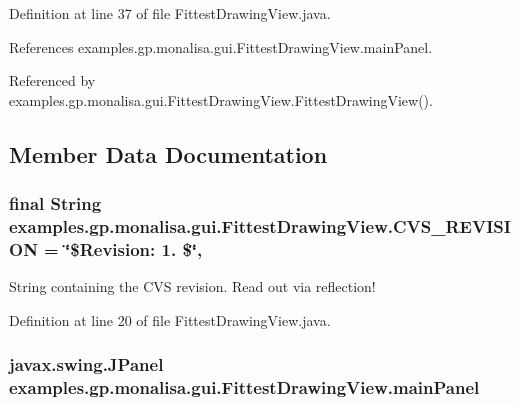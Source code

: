 Definition at line 37 of file Fittest\-Drawing\-View.\-java.



References examples.\-gp.\-monalisa.\-gui.\-Fittest\-Drawing\-View.\-main\-Panel.



Referenced by examples.\-gp.\-monalisa.\-gui.\-Fittest\-Drawing\-View.\-Fittest\-Drawing\-View().



\subsection{Member Data Documentation}
\hypertarget{classexamples_1_1gp_1_1monalisa_1_1gui_1_1_fittest_drawing_view_ae6055da6aad5d8de8cb42272378f9f05}{
\subsubsection[{C\-V\-S\-\_\-\-R\-E\-V\-I\-S\-I\-O\-N}]{\setlength{\rightskip}{0pt plus 5cm}final String examples.\-gp.\-monalisa.\-gui.\-Fittest\-Drawing\-View.\-C\-V\-S\-\_\-\-R\-E\-V\-I\-S\-I\-O\-N = \char`\"{}\$Revision\-: 1. \$\char`\"{}\hspace{0.3cm}{\ttfamily [static]}, {\ttfamily [private]}}}\label{classexamples_1_1gp_1_1monalisa_1_1gui_1_1_fittest_drawing_view_ae6055da6aad5d8de8cb42272378f9f05}
String containing the C\-V\-S revision. Read out via reflection! 

Definition at line 20 of file Fittest\-Drawing\-View.\-java.

\hypertarget{classexamples_1_1gp_1_1monalisa_1_1gui_1_1_fittest_drawing_view_a466838532b223edc69311e8193788c7a}{
\subsubsection[{main\-Panel}]{\setlength{\rightskip}{0pt plus 5cm}javax.\-swing.\-J\-Panel examples.\-gp.\-monalisa.\-gui.\-Fittest\-Drawing\-View.\-main\-Panel\hspace{0.3cm}{\ttfamily [private]}}}\label{classexamples_1_1gp_1_1monalisa_1_1gui_1_1_fittest_drawing_view_a466838532b223edc69311e8193788c7a}



